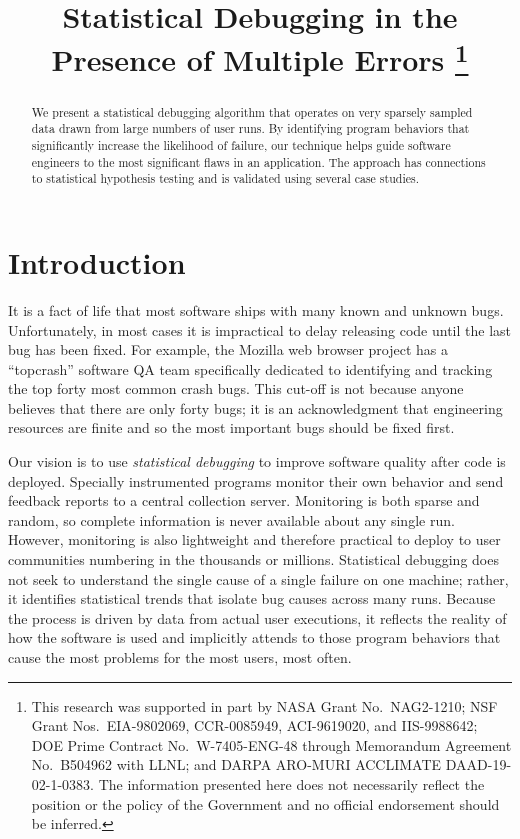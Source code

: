 \documentclass{sig-alternate}
\title{Statistical Debugging in the Presence of Multiple Errors
  \thanks{This research was supported in part by NASA Grant No.\
    NAG2-1210; NSF Grant Nos.\ EIA-9802069, CCR-0085949, ACI-9619020,
    and IIS-9988642; DOE Prime Contract No.\ W-7405-ENG-48 through
    Memorandum Agreement No.\ B504962 with LLNL; and DARPA ARO-MURI 
    ACCLIMATE DAAD-19-02-1-0383.  The information
    presented here does not necessarily reflect the position or the
    policy of the Government and no official endorsement should be
    inferred.}}
\author{
  \alignauthor Ben Liblit \eecs \\
  \alignauthor Mayur Naik \stan \\
  \alignauthor Alice X.\ Zheng \eecs \\
  \moreauthors
  \global\multiply\auwidth by 3
  \global\divide\auwidth by 2
  \alignauthor Alex Aiken \stan \\
  \alignauthor Michael I.\ Jordan \both
  \moreauthors
  \alignauthor
  \affaddr{\eecs Department of Electrical \\ Engineering and Computer Science} \\
  \affaddr{\stat Department of Statistics} \\
  \affaddr{University of California, Berkeley} \\
  \affaddr{Berkeley, CA 94720-1776}
  \alignauthor
  \affaddr{\stan Computer Science Department} \\
  \affaddr{353 Serra Mall} \\
  \affaddr{Stanford University} \\
  \affaddr{Stanford CA 94305-9025}
}
\newcommand{\termdef}[1]{\textit{#1}}
\begin{document}
\CopyrightYear{2004}
\maketitle

\begin{abstract}
  We present a statistical debugging algorithm that operates on very
  sparsely sampled data drawn from large numbers of user runs.  By
  identifying program behaviors that significantly increase the
  likelihood of failure, our technique helps guide software engineers
  to the most significant flaws in an application.  The approach has
  connections to statistical hypothesis testing and is validated
  using several case studies.
\end{abstract}






\section{Introduction}
\label{sec:introduction}

It is a fact of life that most software ships with many known and
unknown bugs.  Unfortunately, in most cases it is impractical to delay
releasing code until the last bug has been fixed.  For example, the
Mozilla web browser project has a ``topcrash'' software QA team
specifically dedicated to identifying and tracking the top forty most
common crash bugs.  This cut-off is not because anyone believes that
there are only forty bugs; it is an acknowledgment that engineering
resources are finite and so the most important bugs should be fixed
first.

Our vision is to use \termdef{statistical debugging} to improve
software quality after code is deployed.  Specially instrumented
programs monitor their own behavior and send feedback reports to a
central collection server.  Monitoring is both sparse and random, so
complete information is never available about any single run.
However, monitoring is also lightweight and therefore practical to
deploy to user communities numbering in the thousands or millions.
Statistical debugging does not seek to understand the single cause of
a single failure on one machine; rather, it identifies statistical
trends that isolate bug causes across many runs.  Because the process
is driven by data from actual user executions, it reflects the reality
of how the software is used and implicitly attends to those program
behaviors that cause the most problems for the most users, most often.
\end{document}
